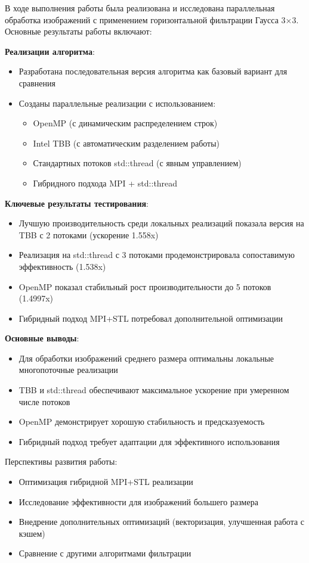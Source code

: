 \documentclass[12pt]{article}
\begin{document}
\hspace*{1.25em}В ходе выполнения работы была реализована и исследована параллельная обработка изображений с применением горизонтальной фильтрации Гаусса 3×3. Основные результаты работы включают:

\textbf{Реализации алгоритма}:
\begin{itemize}
\item Разработана последовательная версия алгоритма как базовый вариант для сравнения
\item Созданы параллельные реализации с использованием:
\begin{itemize}
\item OpenMP (с динамическим распределением строк)
\item Intel TBB (с автоматическим разделением работы)
\item Стандартных потоков std::thread (с явным управлением)
\item Гибридного подхода MPI + std::thread
\end{itemize}
\end{itemize}

\textbf{Ключевые результаты тестирования}:
\begin{itemize}
\item Лучшую производительность среди локальных реализаций показала версия на TBB с 2 потоками (ускорение 1.558x)
\item Реализация на std::thread с 3 потоками продемонстрировала сопоставимую эффективность (1.538x)
\item OpenMP показал стабильный рост производительности до 5 потоков (1.4997x)
\item Гибридный подход MPI+STL потребовал дополнительной оптимизации
\end{itemize}

\textbf{Основные выводы}:
\begin{itemize}
\item Для обработки изображений среднего размера оптимальны локальные многопоточные реализации
\item TBB и std::thread обеспечивают максимальное ускорение при умеренном числе потоков
\item OpenMP демонстрирует хорошую стабильность и предсказуемость
\item Гибридный подход требует адаптации для эффективного использования
\end{itemize}

Перспективы развития работы:
\begin{itemize}
\item Оптимизация гибридной MPI+STL реализации
\item Исследование эффективности для изображений большего размера
\item Внедрение дополнительных оптимизаций (векторизация, улучшенная работа с кэшем)
\item Сравнение с другими алгоритмами фильтрации
\end{itemize}
\end{document}
